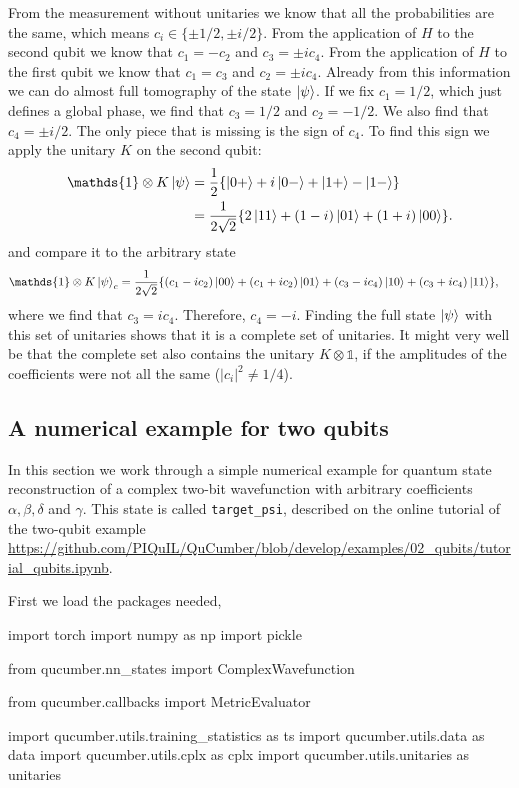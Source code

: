 \documentclass[submission, Phys]{SciPost}
\begin{document}
From the measurement without unitaries we know that all the probabilities are the same,
which means $c_i \in \{ \pm 1/2, \pm i/2 \}$.
From the application of $H$ to the second qubit we know that $c_1 = -c_2$ and $c_3 = \pm i c_4$.
From the application of $H$ to the first qubit we know that $c_1 = c_3$ and $c_2 = \pm i c_4$.
Already from this information we can do almost full tomography of the state $\ket{\psi}$.
If we fix $c_1 = 1/2$, which just defines a global phase, we find that $c_3 = 1/2$ and $c_2 = -1/2$.
We also find that $c_4 = \pm i/2$.
The only piece that is missing is the sign of $c_4$. To find this sign we apply the unitary $K$ on the second qubit:
\begin{align}
	\mathds{1} \otimes K \ket{\psi} & = \frac{1}{2} \{ \ket{0+} +i \ket{0-} + \ket{1+} - \ket{1-} \}           \\
	                                & = \frac{1}{2 \sqrt{2}} \{ 2 \ket{11} + (1-i)\ket{01} + (1+i)\ket{00} \}.
\end{align}
%
and compare it to the arbitrary state
%
\begin{align}
	\mathds{1} \otimes K \ket{\psi}_c & = \frac{1}{2\sqrt{2}} \{ (c_1-ic_2) \ket{00} + (c_1 +ic_2)\ket{01} + (c_3 -ic_4)\ket{10} + (c_3+ic_4)\ket{11} \},
\end{align}
%
where we find that $c_3 = ic_4$. Therefore, $c_4 = -i$.
Finding the full state $\ket{\psi}$ with this set of unitaries shows that it is a complete set of unitaries.
It might very well be that the complete set also contains the unitary $K \otimes \mathds{1}$,
if the amplitudes of the coefficients were not all the same ($|c_i|^2 \neq 1/4$).

\subsection{A numerical example for two qubits}

In this section we work through a simple numerical example for quantum state reconstruction of a complex two-bit wavefunction with arbitrary coefficients $\alpha, \beta, \delta$ and $\gamma$.  This state is called \verb|target_psi|, described on the online tutorial of the two-qubit example \url{https://github.com/PIQuIL/QuCumber/blob/develop/examples/02_qubits/tutorial_qubits.ipynb}.


First we load the packages needed,

\begin{python}
import torch
import numpy as np
import pickle

from qucumber.nn_states import ComplexWavefunction

from qucumber.callbacks import MetricEvaluator

import qucumber.utils.training_statistics as ts
import qucumber.utils.data as data              
import qucumber.utils.cplx as cplx              
import qucumber.utils.unitaries as unitaries
\end{python}
\end{document}
